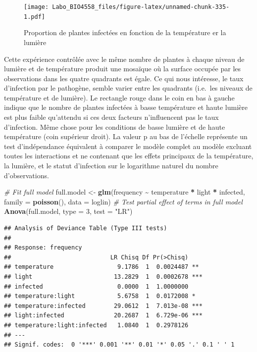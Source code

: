 \documentclass[
  12pt,
]{book}
\newenvironment{Shaded}{\begin{snugshade}}{\end{snugshade}}
\newcommand{\CommentTok}[1]{\textcolor[rgb]{0.56,0.35,0.01}{\textit{#1}}}
\newcommand{\DataTypeTok}[1]{\textcolor[rgb]{0.13,0.29,0.53}{#1}}
\newcommand{\DecValTok}[1]{\textcolor[rgb]{0.00,0.00,0.81}{#1}}
\newcommand{\KeywordTok}[1]{\textcolor[rgb]{0.13,0.29,0.53}{\textbf{#1}}}
\newcommand{\NormalTok}[1]{#1}
\newcommand{\OperatorTok}[1]{\textcolor[rgb]{0.81,0.36,0.00}{\textbf{#1}}}
\newcommand{\StringTok}[1]{\textcolor[rgb]{0.31,0.60,0.02}{#1}}
\begin{document}
\begin{figure}
\centering
\texttt{[image: Labo\_BIO4558\_files/figure-latex/unnamed-chunk-335-1.pdf]}
\caption{\label{fig:unnamed-chunk-335}Proportion de plantes infectées en fonction de la température er la lumière}
\end{figure}

Cette expérience contrôlée avec le même nombre de plantes à chaque niveau de lumière et de température produit une mosaïque où la surface occupée par les observations dans les quatre quadrants est égale. Ce qui nous intéresse, le taux d'infection par le pathogène, semble varier entre les quadrants (i.e.~les niveaux de température et de lumière). Le rectangle rouge dans le coin en bas à gauche indique que le nombre de plantes infectées à basse température et haute lumière est plus faible qu'attendu si ces deux facteurs n'influencent pas le taux d'infection. Même chose pour les conditions de basse lumière et de haute température (coin supérieur droit). La valeur p au bas de l'échelle représente un test d'indépendance équivalent à comparer le modèle complet au modèle excluant toutes les interactions et ne contenant que les effets principaux de la température, la lumière, et le statut d'infection sur le logarithme naturel du nombre d'observations.

\begin{Shaded}
\begin{Highlighting}[]
\CommentTok{\# Fit full model}
\NormalTok{full.model \textless{}{-}}\StringTok{ }\KeywordTok{glm}\NormalTok{(frequency }\OperatorTok{\textasciitilde{}}\StringTok{ }\NormalTok{temperature }\OperatorTok{*}\StringTok{ }\NormalTok{light }\OperatorTok{*}\StringTok{ }\NormalTok{infected, }\DataTypeTok{family =} \KeywordTok{poisson}\NormalTok{(), }\DataTypeTok{data =}\NormalTok{ loglin)}
\CommentTok{\# Test partial effect of terms in full model}
\KeywordTok{Anova}\NormalTok{(full.model, }\DataTypeTok{type =} \DecValTok{3}\NormalTok{, }\DataTypeTok{test =} \StringTok{"LR"}\NormalTok{)}
\end{Highlighting}
\end{Shaded}

\begin{verbatim}
## Analysis of Deviance Table (Type III tests)
## 
## Response: frequency
##                            LR Chisq Df Pr(>Chisq)    
## temperature                  9.1786  1  0.0024487 ** 
## light                       13.2829  1  0.0002678 ***
## infected                     0.0000  1  1.0000000    
## temperature:light            5.6758  1  0.0172008 *  
## temperature:infected        29.0612  1  7.013e-08 ***
## light:infected              20.2687  1  6.729e-06 ***
## temperature:light:infected   1.0840  1  0.2978126    
## ---
## Signif. codes:  0 '***' 0.001 '**' 0.01 '*' 0.05 '.' 0.1 ' ' 1
\end{verbatim}
\end{document}
